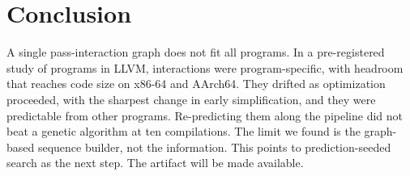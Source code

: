 \section{Conclusion}

A single pass-interaction graph does not fit all programs. In a pre-registered study of \NPrograms{}
programs in LLVM, interactions were program-specific, with headroom that reaches code size on x86-64
and AArch64. They drifted as optimization proceeded, with the sharpest change in early simplification, and they
were predictable from other programs. Re-predicting them along the pipeline did not beat a genetic
algorithm at ten compilations. The limit we found is the graph-based sequence builder, not the
information. This points to prediction-seeded search as the next step. The artifact will be made
available.
